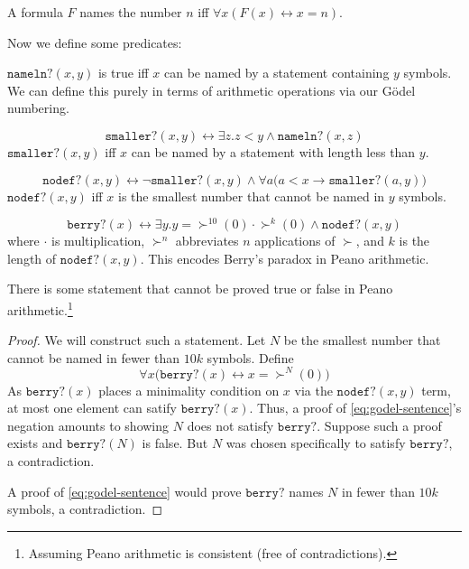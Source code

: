 \message{ !name(truth.tex)}\documentclass{scrbook}
\renewcommand{\implies}{\to}
\renewcommand{\iff}{\leftrightarrow}
\begin{document}
\begin{defn}[names]
  A formula $F$ names the number $n$ iff $\forall x (F(x)\iff x=n)$. 
\end{defn}
Now we define some predicates:
\newcommand{\namelen}{\texttt{nameln?}}
\begin{defn}[\namelen]
  $\namelen(x,y)$ is true iff $x$ can be named by a statement containing $y$ symbols. We can define this purely in terms of arithmetic operations via our Gödel numbering. 
\end{defn}
\newcommand{\namesmaller}{\texttt{smaller?}}
\begin{defn}[\namesmaller]
  \[
  \namesmaller(x,y)\iff \exists z .z < y \wedge \namelen(x,z)
  \]
  \ie $\namesmaller(x,y)$ iff $x$ can be named by a statement with length less than $y$. 
\end{defn}
\newcommand{\minnodef}{\texttt{nodef?}}
\begin{defn}[\minnodef]
  \[
  \minnodef(x,y)\iff \neg \namesmaller(x,y) \wedge \forall a \bigl(a < x \implies \namesmaller(a,y)\bigr)
  \]
  \ie $\minnodef(x,y)$ iff $x$ is the smallest number that cannot be named in $y$ symbols. 
\end{defn}
\newcommand{\berry}{\texttt{berry?}}
\begin{defn}[\berry]
  \[
  \berry(x) \iff\exists y. y=\succ^{10}(0)\cdot \succ^{k}(0)\wedge \minnodef(x,y)
  \]
  where $\cdot$ is multiplication, $\succ^n$ abbreviates $n$ applications of $\succ$, and $k$ is the length of $\minnodef(x,y)$.
  This encodes Berry's paradox in Peano arithmetic. 
\end{defn}
\begin{theorem}
  There is some statement that cannot be proved true or false in Peano arithmetic.\footnote{Assuming Peano arithmetic is consistent (free of contradictions).}
\end{theorem}
\begin{proof}
  We will construct such a statement. Let $N$ be the smallest number that cannot be named in fewer than $10k$ symbols. Define 
  \begin{equation}
    \label{eq:godel-sentence}
    \forall x \bigl(\berry (x) \iff x= \succ^N(0)\bigr)
  \end{equation}
  As $\berry(x)$ places a minimality condition on $x$ via the $\minnodef(x,y)$ term, at most one element can satify $\berry(x)$. Thus, 
  a proof of \cref{eq:godel-sentence}'s negation amounts to showing $N$ does not satisfy $\berry$. Suppose such a proof exists and $\berry(N)$ is false. But $N$ was chosen specifically to satisfy $\berry$, a contradiction.

  A proof of \cref{eq:godel-sentence} would prove $\berry$ names $N$ in fewer than $10k$ symbols, a contradiction. 
\end{proof}
\end{document}
